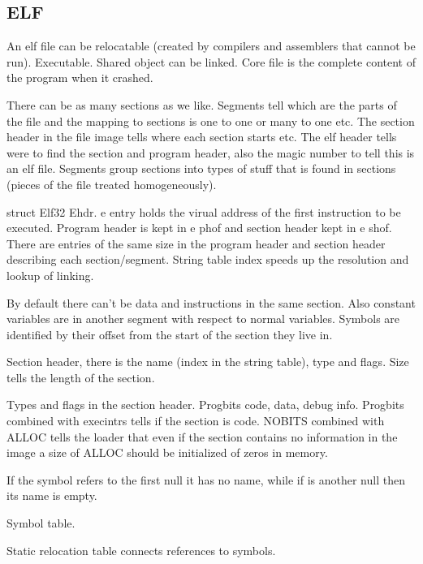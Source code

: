 \documentclass[twoside]{article}
\begin{document}
\subsection{ELF}
\label{subsec:ELF}

An elf file can be relocatable (created by compilers and assemblers that cannot
be run). Executable. Shared object can be linked. Core file is the complete
content of the program when it crashed.

There can be as many sections as we like. Segments tell which are the parts of
the file and the mapping to sections is one to one or many to one etc. The
section header in the file image tells where each section starts etc. The elf
header tells were to find the section and program header, also the magic number
to tell this is an elf file. Segments group sections into types of stuff that is
found in sections (pieces of the file treated homogeneously).

struct Elf32 Ehdr. e entry holds the virual address of the first instruction to
be executed. Program header is kept in e phof and section header kept in e shof.
There are entries of the same size in the program header and section header
describing each section/segment. String table index speeds up the resolution and
lookup of linking.

By default there can't be data and instructions in the same section. Also
constant variables are in another segment with respect to normal variables.
Symbols are identified by their offset from the start of the section they live
in.

Section header, there is the name (index in the string table), type and flags.
Size tells the length of the section.

Types and flags in the section header. Progbits code, data, debug info. Progbits
combined with execintrs tells if the section is code. NOBITS combined with ALLOC
tells the loader that even if the section contains no information in the image a
size of ALLOC should be initialized of zeros in memory.

If the symbol refers to the first null it has no name, while if is another null
then its name is empty.

Symbol table.

Static relocation table connects references to symbols.

\newpage


\end{document}
